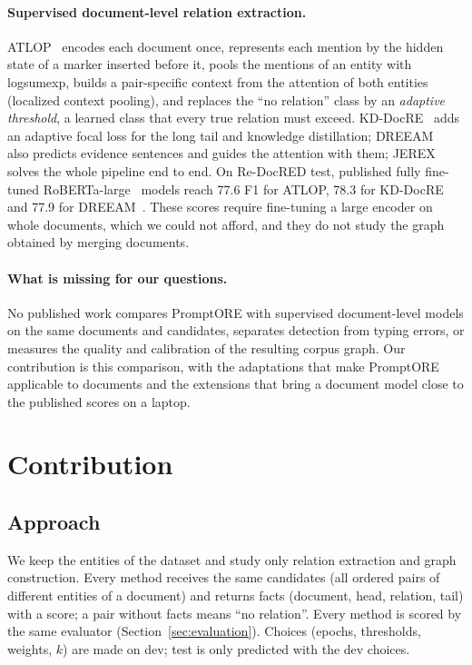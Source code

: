 \documentclass[pdflatex,sn-mathphys-num]{sn-jnl}
\begin{document}
\paragraph{Supervised document-level relation extraction.} ATLOP~\cite{zhou2021atlop} encodes each document once, represents each mention by the hidden state of a marker inserted before it, pools the mentions of an entity with logsumexp, builds a pair-specific context from the attention of both entities (localized context pooling), and replaces the ``no relation'' class by an \emph{adaptive threshold}, a learned class that every true relation must exceed. KD-DocRE~\cite{tan2022kddocre} adds an adaptive focal loss for the long tail and knowledge distillation; DREEAM~\cite{ma2023dreeam} also predicts evidence sentences and guides the attention with them; JEREX~\cite{eberts2021jerex} solves the whole pipeline end to end. On Re-DocRED test, published fully fine-tuned RoBERTa-large~\cite{liu2019roberta} models reach 77.6 F1 for ATLOP, 78.3 for KD-DocRE and 77.9 for DREEAM~\cite{tan2022redocred,ma2023dreeam}. These scores require fine-tuning a large encoder on whole documents, which we could not afford, and they do not study the graph obtained by merging documents.

\paragraph{What is missing for our questions.} No published work compares PromptORE with supervised document-level models on the same documents and candidates, separates detection from typing errors, or measures the quality and calibration of the resulting corpus graph. Our contribution is this comparison, with the adaptations that make PromptORE applicable to documents and the extensions that bring a document model close to the published scores on a laptop.

\section{Contribution}\label{sec:contribution}

\subsection{Approach}\label{sec:approach}

We keep the entities of the dataset and study only relation extraction and graph construction. Every method receives the same candidates (all ordered pairs of different entities of a document) and returns facts (document, head, relation, tail) with a score; a pair without facts means ``no relation''. Every method is scored by the same evaluator (Section~\ref{sec:evaluation}). Choices (epochs, thresholds, weights, $k$) are made on dev; test is only predicted with the dev choices.
\end{document}
